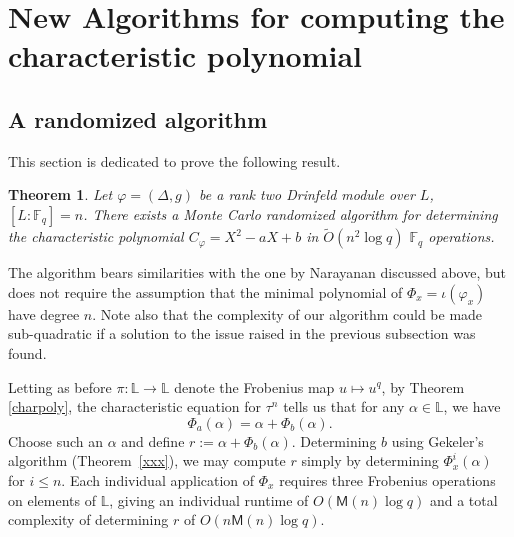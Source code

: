 \documentclass[sigconf]{acmart}
\newtheorem{theorem}{Theorem}
\newcommand{\M}{\mathsf{M}}
\newcommand{\F}{\mathbb{F}}
\renewcommand{\L}{\mathbb{L}}
\begin{document}
\section{New Algorithms for computing the characteristic polynomial}


\subsection{A randomized algorithm}

This section is dedicated to prove the following result.
\begin{theorem}
  Let $\varphi = (\Delta, g)$ be a rank two Drinfeld module over $L$,
  $[L: \F_q] = n$. There exists a Monte Carlo randomized algorithm for
  determining the characteristic polynomial $C_{\varphi} = X^2 -aX + b$
  in $\widetilde{O}(n^2 \log q)$ $\F_q$ operations.
\end{theorem}
The algorithm bears similarities with the one by Narayanan discussed
above, but does not require the assumption that the minimal polynomial
of $\Phi_x=\iota(\varphi_x)$ have degree $n$. Note also that the
complexity of our algorithm could be made sub-quadratic if a solution
to the issue raised in the previous subsection was found.

Letting as before $\pi:\L\to\L$ denote the Frobenius map $u \mapsto
u^q$, by Theorem \ref{charpoly}, the characteristic equation for
$\tau^n$ tells us that for any $\alpha \in \L$, we have
\[\Phi_a(\alpha)=\alpha + \Phi_b(\alpha).\]
Choose such an $\alpha$ and define $r:=\alpha +
\Phi_b(\alpha)$. Determining $b$ using Gekeler's algorithm
(Theorem~\ref{xxx}), we may compute $r$ simply by determining
$\Phi_x^i(\alpha)$ for $i \leq n$. Each individual application of
$\Phi_x$ requires three Frobenius operations on elements of $\L$,
giving an individual runtime of $O(\M(n) \log q)$ and a total
complexity of determining $r$ of $O(n\M(n)  \log q)$.
\end{document}
